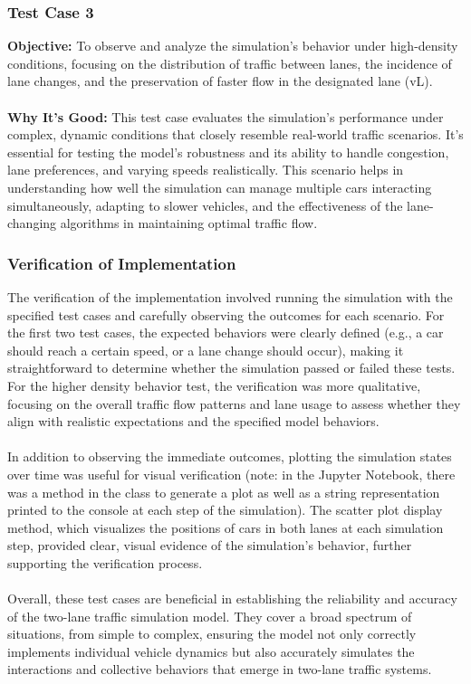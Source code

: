 \documentclass{article}
\begin{document}
\subsubsection{Test Case 3}
\textbf{Objective:} To observe and analyze the simulation's behavior under high-density conditions, focusing on the distribution of traffic between lanes, the incidence of lane changes, and the preservation of faster flow in the designated lane (vL).\\\\
\textbf{Why It's Good:} This test case evaluates the simulation's performance under complex, dynamic conditions that closely resemble real-world traffic scenarios. It's essential for testing the model's robustness and its ability to handle congestion, lane preferences, and varying speeds realistically. This scenario helps in understanding how well the simulation can manage multiple cars interacting simultaneously, adapting to slower vehicles, and the effectiveness of the lane-changing algorithms in maintaining optimal traffic flow.

\subsubsection{Verification of Implementation}
The verification of the implementation involved running the simulation with the specified test cases and carefully observing the outcomes for each scenario. For the first two test cases, the expected behaviors were clearly defined (e.g., a car should reach a certain speed, or a lane change should occur), making it straightforward to determine whether the simulation passed or failed these tests. For the higher density behavior test, the verification was more qualitative, focusing on the overall traffic flow patterns and lane usage to assess whether they align with realistic expectations and the specified model behaviors.\\\\
In addition to observing the immediate outcomes, plotting the simulation states over time was useful for visual verification (note: in the Jupyter Notebook, there was a method in the  class to generate a plot as well as a string representation printed to the console at each step of the simulation). The scatter plot display method, which visualizes the positions of cars in both lanes at each simulation step, provided clear, visual evidence of the simulation's behavior, further supporting the verification process.\\\\
Overall, these test cases are beneficial in establishing the reliability and accuracy of the two-lane traffic simulation model. They cover a broad spectrum of situations, from simple to complex, ensuring the model not only correctly implements individual vehicle dynamics but also accurately simulates the interactions and collective behaviors that emerge in two-lane traffic systems.
\end{document}
